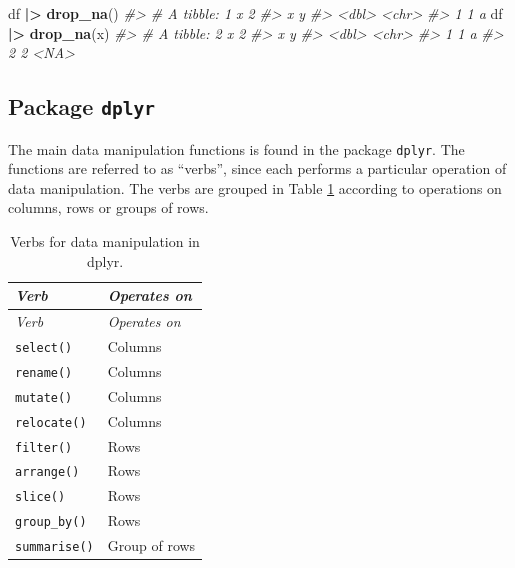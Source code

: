 \documentclass[
]{book}
\newenvironment{Shaded}{\begin{snugshade}}{\end{snugshade}}
\newcommand{\CommentTok}[1]{\textcolor[rgb]{0.56,0.35,0.01}{\textit{#1}}}
\newcommand{\FunctionTok}[1]{\textcolor[rgb]{0.13,0.29,0.53}{\textbf{#1}}}
\newcommand{\NormalTok}[1]{#1}
\newcommand{\SpecialCharTok}[1]{\textcolor[rgb]{0.81,0.36,0.00}{\textbf{#1}}}
\begin{document}
\begin{Shaded}
\begin{Highlighting}[]
\NormalTok{df }\SpecialCharTok{|\textgreater{}} \FunctionTok{drop\_na}\NormalTok{()}
\CommentTok{\#\textgreater{} \# A tibble: 1 x 2}
\CommentTok{\#\textgreater{}       x y    }
\CommentTok{\#\textgreater{}   \textless{}dbl\textgreater{} \textless{}chr\textgreater{}}
\CommentTok{\#\textgreater{} 1     1 a}
\NormalTok{df }\SpecialCharTok{|\textgreater{}} \FunctionTok{drop\_na}\NormalTok{(x)}
\CommentTok{\#\textgreater{} \# A tibble: 2 x 2}
\CommentTok{\#\textgreater{}       x y    }
\CommentTok{\#\textgreater{}   \textless{}dbl\textgreater{} \textless{}chr\textgreater{}}
\CommentTok{\#\textgreater{} 1     1 a    }
\CommentTok{\#\textgreater{} 2     2 \textless{}NA\textgreater{}}
\end{Highlighting}
\end{Shaded}

\subsection{\texorpdfstring{Package \texttt{dplyr}}{Package dplyr}}\label{dplyr}

The main data manipulation functions is found in the package \texttt{dplyr}. The functions are referred to as ``verbs'', since each performs a particular operation of data manipulation. The verbs are grouped in Table \ref{tab:dplyr} according to operations on columns, rows or groups of rows.

\begin{longtable}[]{@{}
  >{\raggedright\arraybackslash}p{}
  >{\raggedright\arraybackslash}p{}@{}}
\caption{\label{tab:dplyr} Verbs for data manipulation in dplyr.}\tabularnewline
\toprule\noalign{}
\begin{minipage}[b]{\linewidth}\raggedright
\emph{{Verb}}
\end{minipage} & \begin{minipage}[b]{\linewidth}\raggedright
\emph{{Operates on}}
\end{minipage} \\
\midrule\noalign{}
\endfirsthead
\toprule\noalign{}
\begin{minipage}[b]{\linewidth}\raggedright
\emph{{Verb}}
\end{minipage} & \begin{minipage}[b]{\linewidth}\raggedright
\emph{{Operates on}}
\end{minipage} \\
\midrule\noalign{}
\endhead
\bottomrule\noalign{}
\endlastfoot
\texttt{select()} & Columns \\
\texttt{rename()} & Columns \\
\texttt{mutate()} & Columns \\
\texttt{relocate()} & Columns \\
\texttt{filter()} & Rows \\
\texttt{arrange()} & Rows \\
\texttt{slice()} & Rows \\
\texttt{group\_by()} & Rows \\
\texttt{summarise()} & Group of rows \\
\end{longtable}
\end{document}
